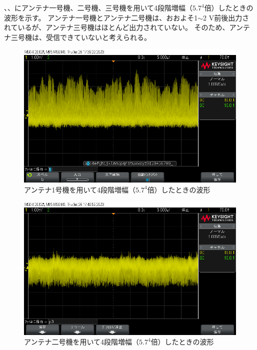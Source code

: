 \documentclass[report.tex]{subfiles}
\begin{document}
、、にアンテナ一号機、二号機、三号機を用いて4段階増幅（\(5.7^4\)倍）したときの波形を示す。
アンテナ一号機とアンテナ二号機は、おおよそ1\(\sim\)2 V前後出力されているが、アンテナ三号機はほとんど出力されていない。
そのため、アンテナ三号機は、受信できていないと考えられる。

\begin{figure}[H]
	\centering
	\includegraphics[width=14cm]{use/b1.png}
	\caption{アンテナ1号機を用いて4段階増幅（\(5.7^4\)倍）したときの波形}
	\label{fig:indad}
\end{figure}

\begin{figure}[H]
	\centering
	\includegraphics[width=14cm]{use/p3.png}
	\caption{アンテナ二号機を用いて4段階増幅（\(5.7^4\)倍）したときの波形}
	\label{fig:indad5}
\end{figure}
\end{document}
